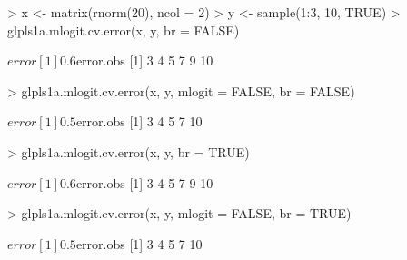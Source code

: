 \documentclass[11pt]{article}
\begin{document}
\begin{Schunk}
\begin{Sinput}
> x <- matrix(rnorm(20), ncol = 2)
> y <- sample(1:3, 10, TRUE)
> glpls1a.mlogit.cv.error(x, y, br = FALSE)
\end{Sinput}
\begin{Soutput}
$error
[1] 0.6

$error.obs
[1]  3  4  5  7  9 10
\end{Soutput}
\begin{Sinput}
> glpls1a.mlogit.cv.error(x, y, mlogit = FALSE, br = FALSE)
\end{Sinput}
\begin{Soutput}
$error
[1] 0.5

$error.obs
[1]  3  4  5  7 10
\end{Soutput}
\begin{Sinput}
> glpls1a.mlogit.cv.error(x, y, br = TRUE)
\end{Sinput}
\begin{Soutput}
$error
[1] 0.6

$error.obs
[1]  3  4  5  7  9 10
\end{Soutput}
\begin{Sinput}
> glpls1a.mlogit.cv.error(x, y, mlogit = FALSE, br = TRUE)
\end{Sinput}
\begin{Soutput}
$error
[1] 0.5

$error.obs
[1]  3  4  5  7 10
\end{Soutput}
\end{Schunk}

%
\end{document}
